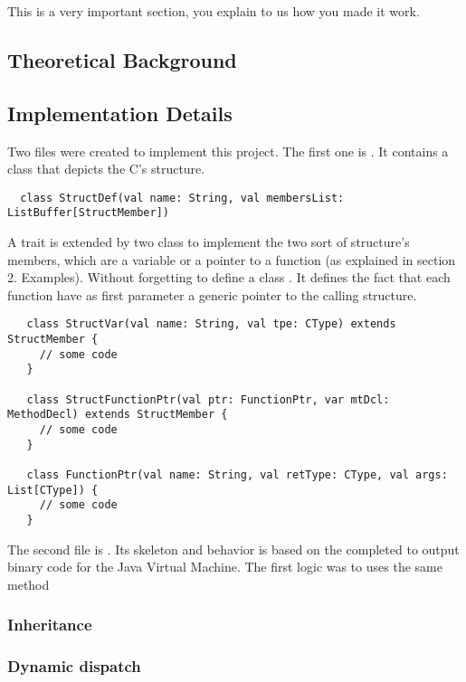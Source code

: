This is a very important section, you explain to us how you made it work.

\subsection{Theoretical Background}

\subsection{Implementation Details}
Two files were created to implement this project.
\newline
The first one is . It contains a class that depicts the C's structure.
\begin{lstlisting}
  class StructDef(val name: String, val membersList: ListBuffer[StructMember])
\end{lstlisting}
 A trait  is extended by two class to implement the two sort of structure's members,
 which are a variable or a pointer to a function (as explained in section 2. Examples).
 Without forgetting to define a class . It defines the fact that each function have as first parameter
 a generic pointer to the calling structure.
 \begin{lstlisting}
   class StructVar(val name: String, val tpe: CType) extends StructMember {
     // some code
   }

   class StructFunctionPtr(val ptr: FunctionPtr, var mtDcl: MethodDecl) extends StructMember {
     // some code
   }

   class FunctionPtr(val name: String, val retType: CType, val args: List[CType]) {
     // some code
   }
 \end{lstlisting}
The second file is . Its skeleton and behavior is based on the  completed
to output binary code for the Java Virtual Machine.
\newline
The first logic was to uses the same method
\subsubsection{Inheritance}
\subsubsection{Dynamic dispatch}
